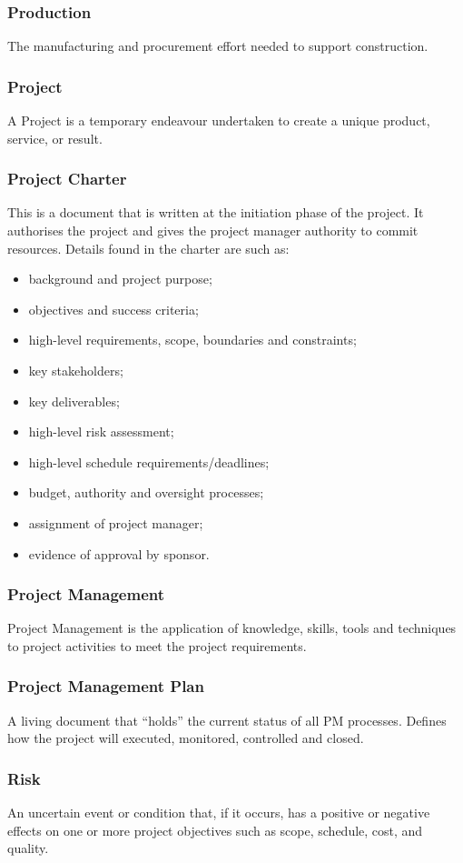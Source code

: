 \documentclass[journal]{IEEEtran}
\begin{document}
\subsubsection{Production}
The manufacturing and procurement effort needed to support construction.
\subsubsection{Project}
A Project is a temporary endeavour undertaken to create a unique product, service, or result.
\subsubsection{Project Charter}
This is a document that is written at the initiation phase of the project. It authorises the project and gives the project manager authority to commit resources. Details found in the charter are such as:
\begin{itemize}
	\item background and project purpose;
	\item objectives and success criteria;
	\item high-level requirements, scope, boundaries and constraints;
	\item key stakeholders;
	\item key deliverables;
	\item high-level risk assessment;
	\item high-level schedule requirements/deadlines;
	\item budget, authority and oversight processes;
	\item assignment of project manager;
	\item evidence of approval by sponsor.	
\end{itemize}
\subsubsection{Project Management}
Project Management is the application of knowledge, skills, tools and techniques to project activities to meet the project requirements.
\subsubsection{Project Management Plan}
A living document that “holds” the current status of all PM processes. Defines how the project will executed, monitored, controlled and closed.
\subsubsection{Risk}
An uncertain event or condition that, if it occurs, has a positive or negative effects on one or more project objectives such as scope, schedule, cost, and quality.
\end{document}

